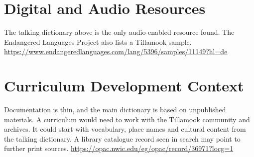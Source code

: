 \documentclass[12pt]{article}
\begin{document}
\section{Digital and Audio Resources}
The talking dictionary above is the only audio-enabled resource found. The Endangered Languages Project also lists a Tillamook sample. \url{https://www.endangeredlanguages.com/lang/5396/samples/11149?hl=de}

\section{Curriculum Development Context}
Documentation is thin, and the main dictionary is based on unpublished materials. A curriculum would need to work with the Tillamook community and archives. It could start with vocabulary, place names and cultural content from the talking dictionary. A library catalogue record seen in search may point to further print sources. \url{https://opac.nwic.edu/eg/opac/record/36971?locg=1}
\end{document}
